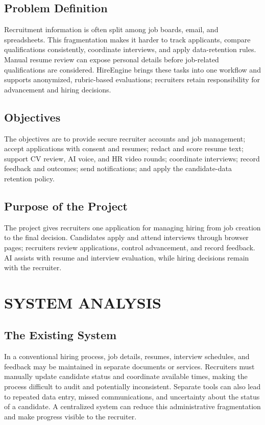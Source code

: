 %
\section{Problem Definition}
Recruitment information is often split among job boards, email, and spreadsheets. This fragmentation makes it harder to track applicants, compare qualifications consistently, coordinate interviews, and apply data-retention rules. Manual resume review can expose personal details before job-related qualifications are considered. HireEngine brings these tasks into one workflow and supports anonymized, rubric-based evaluations; recruiters retain responsibility for advancement and hiring decisions.
%
\section{Objectives}
The objectives are to provide secure recruiter accounts and job management; accept applications with consent and resumes; redact and score resume text; support CV review, AI voice, and HR video rounds; coordinate interviews; record feedback and outcomes; send notifications; and apply the candidate-data retention policy.
%
\section{Purpose of the Project}
The project gives recruiters one application for managing hiring from job creation to the final decision. Candidates apply and attend interviews through browser pages; recruiters review applications, control advancement, and record feedback. AI assists with resume and interview evaluation, while hiring decisions remain with the recruiter.

%
%
%
\chapter{SYSTEM ANALYSIS}
%
\section{The Existing System}	
In a conventional hiring process, job details, resumes, interview schedules, and feedback may be maintained in separate documents or services. Recruiters must manually update candidate status and coordinate available times, making the process difficult to audit and potentially inconsistent. Separate tools can also lead to repeated data entry, missed communications, and uncertainty about the status of a candidate. A centralized system can reduce this administrative fragmentation and make progress visible to the recruiter.


